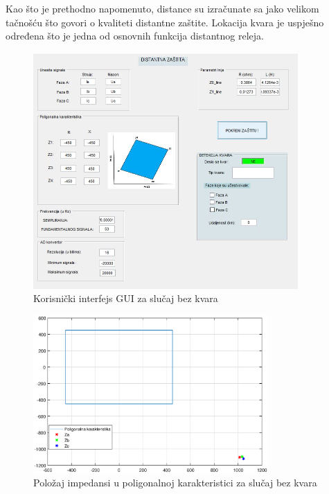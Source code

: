 Kao što je prethodno napomenuto, distance su izračunate sa jako velikom tačnošću što govori o kvaliteti distantne zaštite. Lokacija kvara je uspješno određena što je jedna od osnovnih funkcija distantnog releja.

\begin{figure}[H]
  \centering
  \includegraphics[width=0.9\textwidth]{Rezultati1/GUI_bezKvara.JPG}
  \caption{Korisnički interfejs GUI za slučaj bez kvara}
  \label{fig:57}
\end{figure}


\begin{figure}[H]
  \centering
  \includegraphics[width=0.8\textwidth]{Rezultati1/karakteristika_bezKvara.eps}
  \caption{Položaj impedansi u poligonalnoj karakteristici za slučaj bez kvara}
  \label{fig:58}
\end{figure}



